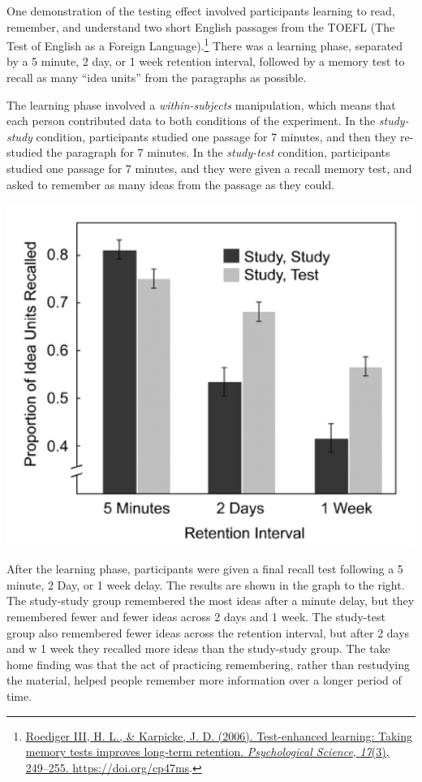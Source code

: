 \documentclass[
  oneside,
  12pt]{crumpbook}
\newenvironment{floatright50}{%
  \wrapfigure{R}{.5\textwidth}%
  }{%
  \endwrapfigure}
\begin{document}
One demonstration of the testing effect involved participants learning to read, remember, and understand two short English passages from the TOEFL (The Test of English as a Foreign Language).\footnote{\protect\hyperlink{ref-roedigeriiiTestenhancedLearningTaking2006}{Roediger III, H. L., \& Karpicke, J. D. (2006). Test-enhanced learning: {Taking} memory tests improves long-term retention. \emph{Psychological Science}, \emph{17}(3), 249--255. \url{https://doi.org/cp47ms}}.} There was a learning phase, separated by a 5 minute, 2 day, or 1 week retention interval, followed by a memory test to recall as many ``idea units'' from the paragraphs as possible.

The learning phase involved a \emph{within-subjects} manipulation, which means that each person contributed data to both conditions of the experiment. In the \emph{study-study} condition, participants studied one passage for 7 minutes, and then they re-studied the paragraph for 7 minutes. In the \emph{study-test} condition, participants studied one passage for 7 minutes, and they were given a recall memory test, and asked to remember as many ideas from the passage as they could.

\begin{floatright50}
\includegraphics[width=1\linewidth]{imgs/Test_enhanced}

\end{floatright50}

After the learning phase, participants were given a final recall test following a 5 minute, 2 Day, or 1 week delay. The results are shown in the graph to the right. The study-study group remembered the most ideas after a minute delay, but they remembered fewer and fewer ideas across 2 days and 1 week. The study-test group also remembered fewer ideas across the retention interval, but after 2 days and w 1 week they recalled more ideas than the study-study group. The take home finding was that the act of practicing remembering, rather than restudying the material, helped people remember more information over a longer period of time.
\end{document}
